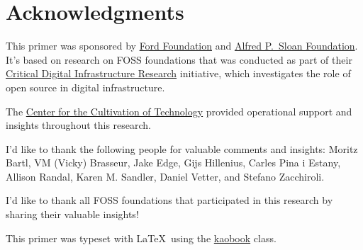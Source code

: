 


\chapter{Acknowledgments}

This primer was sponsored by \href{https://www.fordfoundation.org/}{Ford Foundation} and \href{https://sloan.org/}{Alfred P.\ Sloan Foundation}.  It's based on research on FOSS foundations that was conducted as part of their \href{https://www.fordfoundation.org/campaigns/critical-digital-infrastructure-research/}{Critical Digital Infrastructure Research} initiative, which investigates the role of open source in digital infrastructure.

The \href{https://techcultivation.org/}{Center for the Cultivation of Technology} provided operational support and insights throughout this research.

I'd like to thank the following people for valuable comments and insights: Moritz Bartl, VM (Vicky) Brasseur, Jake Edge, Gijs Hillenius, Carles Pina i Estany, Allison Randal, Karen M. Sandler, Daniel Vetter, and Stefano Zacchiroli.

I'd like to thank all FOSS foundations that participated in this research by sharing their valuable insights!

This primer was typeset with \LaTeX\ using the \href{https://github.com/fmarotta/kaobook}{kaobook} class.

